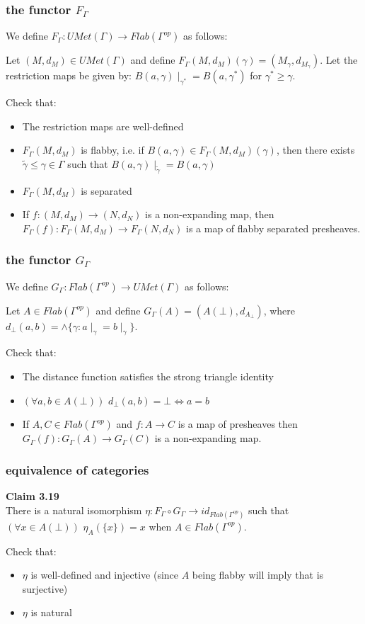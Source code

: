 \documentclass{beamer}
\begin{document}
\begin{frame}
\frametitle{the functor $F_\Gamma$}
We define $F_\Gamma: UMet(\Gamma) \rightarrow Flab(\Gamma^{op})$ as follows:
\begin{definition}
Let $(M,d_M) \in UMet(\Gamma)$ and define $F_\Gamma(M, d_M)(\gamma) = (M_\gamma,d_{M_\gamma})$. Let the restriction maps be given by: $B(a,\gamma)\mid_{\gamma^*}=B(a,\gamma^*)$ for $\gamma^* \geq \gamma$.
\end{definition}
Check that:
\begin{itemize}
	\item The restriction maps are well-defined
	\item $ F_\Gamma(M,d_M)$ is flabby, i.e. if $B(a,\gamma) \in F_\Gamma(M,d_M)(\gamma)$, then there exists $\tilde{\gamma} \leq \gamma \in \Gamma$ such that $B(a, \gamma)\mid_{\tilde{\gamma}} = B(a,\gamma)$
	\item $ F_\Gamma(M,d_M)$ is separated
	\item If $f:(M,d_M) \rightarrow (N,d_N)$ is a non-expanding map, then $F_\Gamma(f):F_\Gamma(M,d_M) \rightarrow F_\Gamma(N,d_N)$ is a map of flabby separated presheaves. 
\end{itemize}
\end{frame}

\begin{frame}
\frametitle{the functor $G_\Gamma$}
We define $G_\Gamma: Flab(\Gamma^{op}) \rightarrow UMet(\Gamma)$ as follows:
	\begin{definition}
		Let $A \in Flab(\Gamma^{op})$ and define $G_\Gamma(A)=(A(\bot), d_{A_\bot})$, where $d_{\bot}(a,b) = \wedge\{\gamma:a\mid_\gamma = b\mid_\gamma\}$.
	\end{definition}
	
Check that:
	\begin{itemize}
		\item The distance function satisfies the strong triangle identity
		\item $(\forall a,b \in A(\bot))$   $d_{\bot}(a,b) = \bot \iff a =b$
		\item If $A,C \in Flab(\Gamma^{op})$ and $f:A \rightarrow C$ is a map of presheaves then $G_\Gamma(f):G_\Gamma(A) \rightarrow G_\Gamma(C)$ is a non-expanding map.
			
	\end{itemize}
\end{frame}

\begin{frame}
\frametitle{equivalence of categories}	
\textbf{Claim 3.19}\\ 
There is a natural isomorphism $\eta: F_\Gamma \circ G_\Gamma \rightarrow id_{Flab(\Gamma^{op})}$ such that $(\forall x \in A(\bot))$  $\eta_A(\{x\})=x$
when $A \in Flab(\Gamma^{op})$.

Check that:
\begin{itemize}
	\item $\eta$ is well-defined and injective (since $A$ being flabby will imply that is surjective)
	\item $\eta$ is natural
\end{itemize}
\end{frame}
\end{document}
